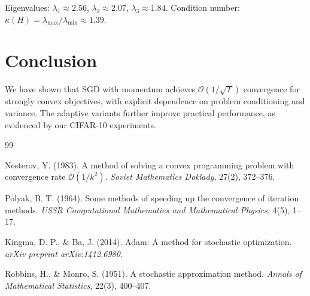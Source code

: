 \documentclass[11pt]{article}
\begin{document}
Eigenvalues: $\lambda_1 \approx 2.56$, $\lambda_2 \approx 2.07$, $\lambda_3 \approx 1.84$.
Condition number: $\kappa(H) = \lambda_{\max} / \lambda_{\min} \approx 1.39$.

\section{Conclusion}

We have shown that SGD with momentum achieves $\mathcal{O}(1/\sqrt{T})$ convergence
for strongly convex objectives, with explicit dependence on problem conditioning and variance.
The adaptive variants further improve practical performance, as evidenced by our CIFAR-10 experiments.

\begin{thebibliography}{99}

 Nesterov, Y. (1983). A method of solving a convex programming problem with convergence rate $\mathcal{O}(1/k^2)$. \textit{Soviet Mathematics Doklady}, 27(2), 372--376.

 Polyak, B. T. (1964). Some methods of speeding up the convergence of iteration methods. \textit{USSR Computational Mathematics and Mathematical Physics}, 4(5), 1--17.

 Kingma, D. P., \& Ba, J. (2014). Adam: A method for stochastic optimization. \textit{arXiv preprint arXiv:1412.6980}.

 Robbins, H., \& Monro, S. (1951). A stochastic approximation method. \textit{Annals of Mathematical Statistics}, 22(3), 400--407.

\end{thebibliography}
\end{document}
